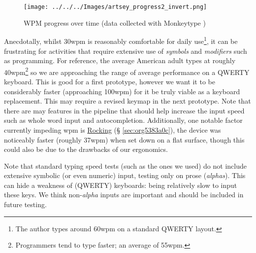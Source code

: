 \documentclass[logo,bsc,singlespacing,parskip]{infthesis}
\begin{document}
\begin{figure}[h]
\centering
\texttt{[image: ../../../Images/artsey\_progress2\_invert.png]}
\caption[WPM progress over time]{\label{fig:wpm}WPM progress over time (data collected with Monkeytype \autocite{miodecMonkeytype})}
\end{figure}

Anecdotally, whilst 30wpm is reasonably comfortable for daily use\footnote{The author types around 60wpm on a standard QWERTY layout.}, it can be frustrating for activities that require extensive use of \emph{symbols} and \emph{modifiers} such as programming.
For reference, the average American adult types at roughly 40wpm\footnote{Programmers tend to type faster; an average of 55wpm.} \autocite{WhatAverageTyping} so we are approaching the range of average performance on a QWERTY keyboard.
This is good for a first prototype, however we want it to be considerably faster (approaching 100wpm) for it be truly viable as a keyboard replacement.
This may require a revised keymap in the next prototype.
Note that there are may features in the pipeline that should help increase the input speed such as whole word input and autocompletion.
Additionally, one notable factor currently impeding wpm is
\hyperref[sec:org5383a0c]{Rocking} (§ \ref{sec:org5383a0c}),  the device was noticeably faster (roughly 37wpm) when set down on a flat surface, though this could also be due to the drawbacks of our ergonomics. \medskip

Note that standard typing speed tests (such as the ones we used) do not include extensive symbolic (or even numeric) input, testing only on prose (\emph{alphas}). This can hide a weakness of (QWERTY) keyboards: being relatively slow to input these keys. We think non-\emph{alpha} inputs are important and should be included in future testing.
\end{document}
